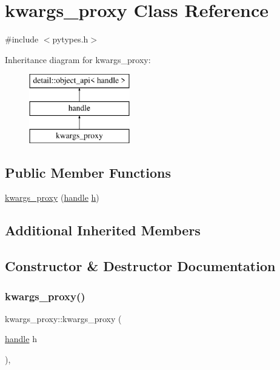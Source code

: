 \hypertarget{classkwargs__proxy}{}\section{kwargs\+\_\+proxy Class Reference}
\label{classkwargs__proxy}


{\ttfamily \#include $<$pytypes.\+h$>$}

Inheritance diagram for kwargs\+\_\+proxy\+:\begin{figure}[H]
\begin{center}
\leavevmode
\includegraphics[height=3.000000cm]{classkwargs__proxy}
\end{center}
\end{figure}
\subsection*{Public Member Functions}
\begin{DoxyCompactItemize}
\item 
\mbox{\hyperlink{classkwargs__proxy_a365362a83bba30bd75f8bc610dd93563}{kwargs\+\_\+proxy}} (\mbox{\hyperlink{classhandle}{handle}} \mbox{\hyperlink{_s_d_l__opengl__glext_8h_afa0fb1b5e976920c0abeff2dca3ed774}{h}})
\end{DoxyCompactItemize}
\subsection*{Additional Inherited Members}


\subsection{Constructor \& Destructor Documentation}
\mbox{\label{classkwargs__proxy_a365362a83bba30bd75f8bc610dd93563}} 
\subsubsection{\texorpdfstring{kwargs\_proxy()}{kwargs\_proxy()}}
{\footnotesize\ttfamily kwargs\+\_\+proxy\+::kwargs\+\_\+proxy (\begin{DoxyParamCaption}\item[{\mbox{\hyperlink{classhandle}{handle}}}]{h }\end{DoxyParamCaption})\hspace{0.3cm}{\ttfamily [inline]}, {\ttfamily [explicit]}}



